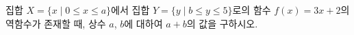 집합 $X=\{x \mid 0\le x\le a\}$에서 집합 $Y=\{y \mid b\le y\le 5\}$로의 함수 $f(x)=3x+2$의 역함수가 존재할 때, 상수 $a$, $b$에 대하여 $a+b$의 값을 구하시오.
